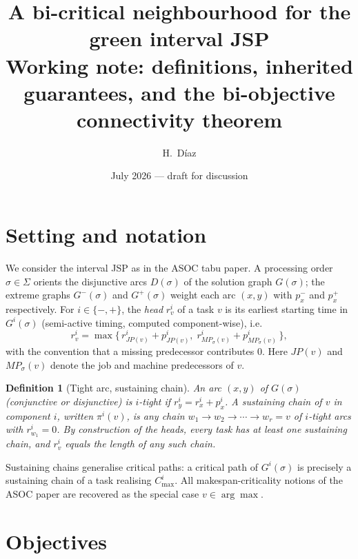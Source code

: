 \documentclass[11pt,a4paper]{article}
\title{\textbf{A bi-critical neighbourhood for the green interval JSP}\\
{\large Working note: definitions, inherited guarantees, and the
bi-objective connectivity theorem}}
\author{H.~D\'iaz}
\date{July 2026 --- draft for discussion}
\newtheorem{definition}{Definition}
\begin{document}
\maketitle

\section{Setting and notation}

We consider the interval JSP as in the ASOC tabu paper. A processing order
$\sigma\in\Sigma$ orients the disjunctive arcs $D(\sigma)$ of the solution
graph $G(\sigma)$; the extreme graphs $G^{-}(\sigma)$ and $G^{+}(\sigma)$
weight each arc $(x,y)$ with $p_x^{-}$ and $p_x^{+}$ respectively. For
$i\in\{-,+\}$, the \emph{head} $r^i_v$ of a task $v$ is its earliest starting
time in $G^{i}(\sigma)$ (semi-active timing, computed component-wise), i.e.
\[
r^i_v=\max\bigl\{\,r^i_{JP(v)}+p^i_{JP(v)},\; r^i_{MP_\sigma(v)}+p^i_{MP_\sigma(v)}\,\bigr\},
\]
with the convention that a missing predecessor contributes $0$. Here $JP(v)$
and $MP_\sigma(v)$ denote the job and machine predecessors of $v$.

\begin{definition}[Tight arc, sustaining chain]\label{def:tight}
An arc $(x,y)$ of $G(\sigma)$ (conjunctive or disjunctive) is
\emph{$i$-tight} if $r^i_y=r^i_x+p^i_x$. A \emph{sustaining chain of $v$ in
component $i$}, written $\pi^i(v)$, is any chain
$w_1\to w_2\to\cdots\to w_r=v$ of $i$-tight arcs with $r^i_{w_1}=0$.
By construction of the heads, every task has at least one sustaining chain,
and $r^i_v$ equals the length of any such chain.
\end{definition}

Sustaining chains generalise critical paths: a critical path of
$G^{i}(\sigma)$ is precisely a sustaining chain of a task realising
$C^i_{\max}$. All makespan-criticality notions of the ASOC paper are
recovered as the special case $v\in\arg\max$.

\section{Objectives}
\end{document}
